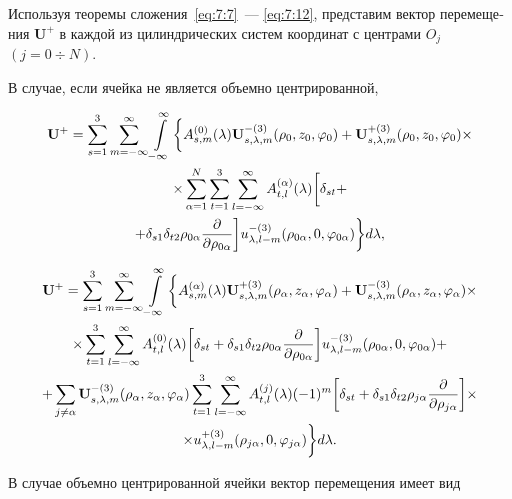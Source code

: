 \begin{russian}
Используя теоремы сложения~\eqref{eq:7:7}~--- \eqref{eq:7:12}, представим вектор перемещения $\mathbf{U}^+$ в каждой из цилиндрических систем координат с центрами $O_j$ $(j=0\div N)$.

В случае, если ячейка не является объемно центрированной,
	
\begin{multline}
{{\bf{U}}^ + } = \sum\limits_{s = 1}^3 {\sum\limits_{m =  - \infty }^\infty  {\int\limits_{ - \infty }^\infty  \bigg\{  } } A_{s,m}^{(0)}(\lambda ){\bf{U}}_{s,\lambda ,m}^{ - (3)}({\rho _0},{z_0},{\varphi _0}) + {\bf{U}}_{s,\lambda ,m}^{ + (3)}({\rho _0},{z_0},{\varphi _0}) \times \\
\times \sum\limits_{\alpha  = 1}^N {\sum\limits_{t = 1}^3 {\sum\limits_{l =  - \infty }^\infty  {A_{t,l}^{(\alpha )}} } } (\lambda )\bigg[{\delta _{st}} + \\
+ {\delta _{s1}}{\delta _{t2}}{\rho _{0\alpha }}\frac{\partial }{{\partial {\rho _{0\alpha }}}}\bigg]u_{\lambda ,l - m}^{ - (3)}({\rho _{0\alpha }},0,{\varphi _{0\alpha }})\bigg\} d\lambda,
\label{eq:7:28}
\end{multline}

\begin{multline}
{{\bf{U}}^ + } = \sum\limits_{s = 1}^3 {\sum\limits_{m =  - \infty }^\infty  {\int\limits_{ - \infty }^\infty  \bigg\{  } } A_{s,m}^{(\alpha )}(\lambda ){\bf{U}}_{s,\lambda ,m}^{ + (3)}({\rho _\alpha },{z_\alpha },{\varphi _\alpha }) + {\bf{U}}_{s,\lambda ,m}^{ - (3)}({\rho _\alpha },{z_\alpha },{\varphi _\alpha }) \times \\
\times \sum\limits_{t = 1}^3 {\sum\limits_{l =  - \infty }^\infty  {A_{t,l}^{(0)}} } (\lambda )\bigg[{\delta _{st}} + {\delta _{s1}}{\delta _{t2}}{\rho _{0\alpha }}\frac{\partial }{{\partial {\rho _{0\alpha }}}}\bigg]u_{\lambda ,l - m}^{ - (3)}({\rho _{0\alpha }},0,{\varphi _{0\alpha }}) + \\
+ \sum\limits_{j \ne \alpha } {{\bf{U}}_{s,\lambda ,m}^{ - (3)}} ({\rho _\alpha },{z_\alpha },{\varphi _\alpha })\sum\limits_{t = 1}^3 {\sum\limits_{l =  - \infty }^\infty  {A_{t,l}^{(j)}} } (\lambda ){( - 1)^m}\bigg[{\delta _{st}} + {\delta _{s1}}{\delta _{t2}}{\rho _{j\alpha }}\frac{\partial }{{\partial {\rho _{j\alpha }}}}\bigg] \times \\
\times u_{\lambda ,l - m}^{ + (3)}({\rho _{j\alpha }},0,{\varphi _{j\alpha }})\bigg\} d\lambda.
\label{eq:7:29}
\end{multline}

В случае объемно центрированной ячейки вектор перемещения имеет вид


\end{russian}
